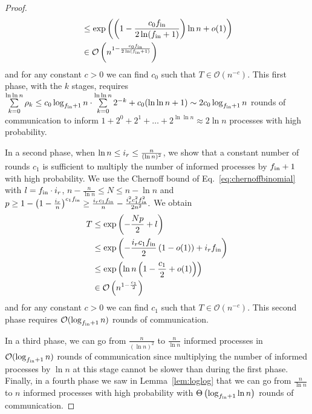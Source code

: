 \begin{proof}
\begin{equation}
\begin{split}
    & \leq \exp\left(\left(1-\frac{c_0f_\text{in}}{2\ln(f_\text{in}+1)}\right) \ln n +o(1)\right) \\
  & \in \mathcal{O}\left(n^{  1-\frac{c_0f_\text{in}}{2\ln(f_\text{in}+1)}}  \right)
\end{split}
\end{equation}
and for any constant $c>0$ we can find $c_0$ such that $T \in \mathcal{O}\left(n^{-c}\right)$. This first phase, with the $k$ stages, requires $\sum\limits_{k=0}^{\ln\ln n} \rho_k \leq c_0 \log_{f_\text{in} + 1} n \cdot \sum\limits_{k=0}^{\ln\ln n} 2^{-k} + c_0(\ln\ln n + 1) \sim 2c_0 \log_{f_\text{in} + 1} n$ rounds of communication to inform $1 + 2^0 + 2^1 + \dots + 2^{\ln\ln n} \approx 2 \ln n$ processes with high probability. 

In a second phase, when $\ln n \leq i_{r} \leq \frac{n}{(\ln n)^2}$, we show that a constant number of rounds $c_1$ is sufficient to multiply the number of informed processes by $f_\text{in}+1$ with high probability. We use the Chernoff bound of Eq.~\eqref{eq:chernoffbinomial} with $l=f_\text{in} \cdot i_{r}$, $n-\frac{n}{\ln n}\leq N \leq n-\ln n$ and $p \geq 1-\left(1-\frac{i_{r}}{n}\right)^{c_1 f_\text{in}} \geq \frac{i_{r}c_1f_\text{in}}{n} -\frac{i_{r}^2 c_1^2 f_\text{in}^2}{2n^2}.$ We obtain
\begin{equation}
  \begin{split}
  T & \leq \exp\left(-\frac{Np}{2}+l\right) \\
    & \leq \exp \left( -\frac{i_{r}c_1f_\text{in}}{2}\left(1-o(1)\right)+i_{r}f_\text{in}\right) \\
    & \leq \exp \left(\ln n\left(1-\frac{c_1}{2}+o(1)\right) \right) \\
    & \in \mathcal{O}\left(n^{  1-\frac{c_1}{2}}  \right)
  \end{split}
\end{equation}
and for any constant $c>0$ we can find $c_1$ such that $T \in \mathcal{O}\left(n^{-c}\right)$.  This second phase requires $\mathcal{O}(\log_{f_\text{in} + 1} n)$ rounds of communication.

In a third phase, we can go from $\frac{n}{(\ln n)^2}$ to $\frac{n}{\ln n}$ informed processes in $\mathcal{O}(\log_{f_\text{in} + 1} n)$ rounds of communication since multiplying the number of informed processes by $\ln n$ at this stage cannot be slower than during the first phase.  Finally, in a fourth phase we saw in Lemma~\ref{lem:loglog} that we can go from $\frac{n}{\ln n}$ to $n$ informed processes with high probability with $\Theta\left(\log_{f_\text{in}+1}\ln n\right)$ rounds of communication.


\end{proof}

